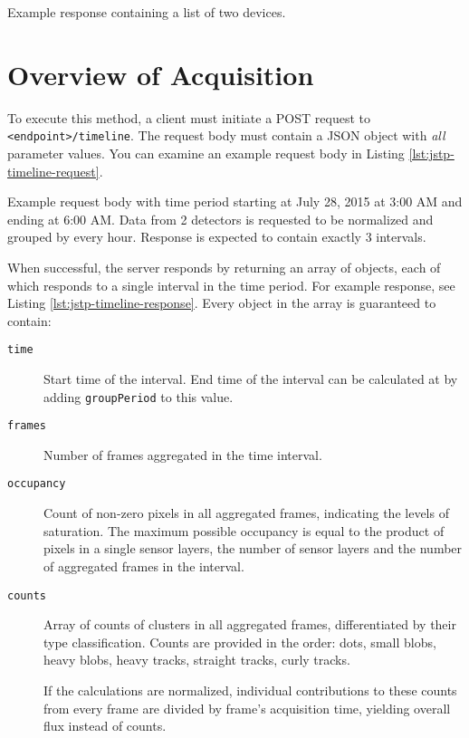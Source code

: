 \begin{listing}
    \caption[JSTP detector list response body.]{Example response containing a list of two devices.}
    \label{lst:jstp-sensors}
\end{listing}


\section{Overview of Acquisition}
\label{apx:jstp-timeline}
To execute this method, a client must initiate a POST request to \texttt{<endpoint>/timeline}. The request body must contain a JSON object with \textit{all} parameter values. You can examine an example request body in Listing \ref{lst:jstp-timeline-request}.

\begin{listing}
    \caption[JSTP acquisition overview request body.]{Example request body with time period starting at July 28, 2015 at 3:00 AM and ending at 6:00 AM. Data from 2 detectors is requested to be normalized and grouped by every hour. Response is expected to contain exactly 3 intervals.}
    \label{lst:jstp-timeline-request}
\end{listing}

When successful, the server responds by returning an array of objects, each of which responds to a single interval in the time period. For example response, see Listing \ref{lst:jstp-timeline-response}. Every object in the array is guaranteed to contain:
~
\begin{description}
	\item[\texttt{time}]
	Start time of the interval. End time of the interval can be calculated at by adding \texttt{groupPeriod} to this value.

	\item[\texttt{frames}]
	Number of frames aggregated in the time interval.
	
	\item[\texttt{occupancy}]
	Count of non-zero pixels in all aggregated frames, indicating the levels of saturation. The maximum possible occupancy is equal to the product of pixels in a single sensor layers, the number of sensor layers and the number of aggregated frames in the interval.
	
	\item[\texttt{counts}]
	Array of counts of clusters in all aggregated frames, differentiated by their type classification. Counts are provided in the order: dots, small blobs, heavy blobs, heavy tracks, straight tracks, curly tracks.

	If the calculations are normalized, individual contributions to these counts from every frame are divided by frame's acquisition time, yielding overall flux instead of counts.
\end{description}

